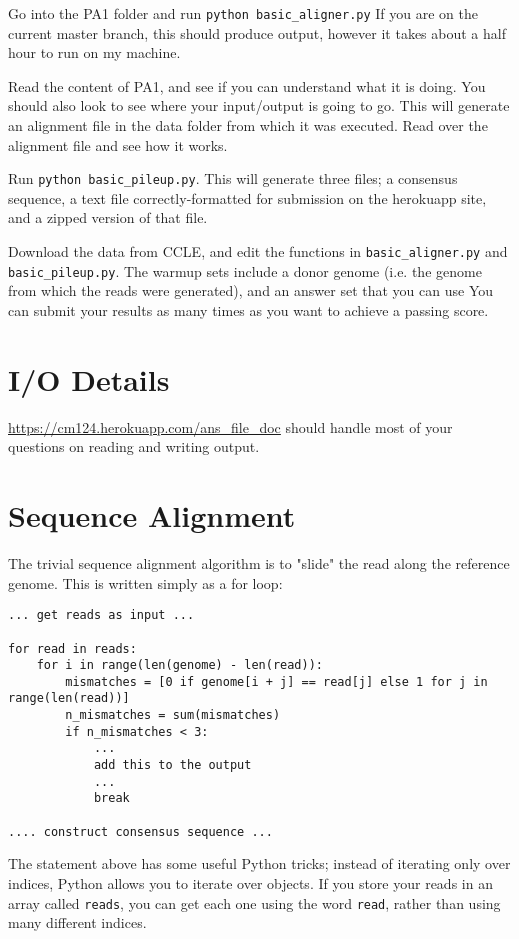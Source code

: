 \documentclass{article}
\begin{document}
Go into the PA1 folder and run \verb!python basic_aligner.py! If you are on the current master branch, this should produce output, however it takes about a half hour to run on my machine.

Read the content of PA1, and see if you can understand what it is doing. You should also look to see where your input/output is going to go. This will generate an alignment file in the data folder from which it was executed. Read over the alignment file and see how it works.

Run \verb|python basic_pileup.py|. This will generate three files; a consensus sequence, a text file correctly-formatted for submission on the herokuapp site, and a zipped version of that file.

Download the data from CCLE, and edit the functions in \verb|basic_aligner.py| and 
\verb|basic_pileup.py|. The warmup sets include a donor genome (i.e. the genome from which the reads were generated), and an answer set that you can use 
You can submit your results as many times as you want to achieve a passing score.

\section*{I/O Details}
\url{https://cm124.herokuapp.com/ans_file_doc} should handle most of your questions on reading and writing output.

\section*{Sequence Alignment}
The trivial sequence alignment algorithm is to "slide" the read along the reference genome. This is written simply as a for loop:

\begin{verbatim}
... get reads as input ...

for read in reads:
    for i in range(len(genome) - len(read)):
	    mismatches = [0 if genome[i + j] == read[j] else 1 for j in range(len(read))]
	    n_mismatches = sum(mismatches)
	    if n_mismatches < 3:
		    ...
		    add this to the output
		    ...
		    break
		    
.... construct consensus sequence ...
\end{verbatim}

The statement above has some useful Python tricks; instead of iterating only over indices, Python allows you to iterate over objects. If you store your reads in an array called \verb!reads!, you can get each one using the word \verb!read!, rather than using many different indices.
\end{document}
